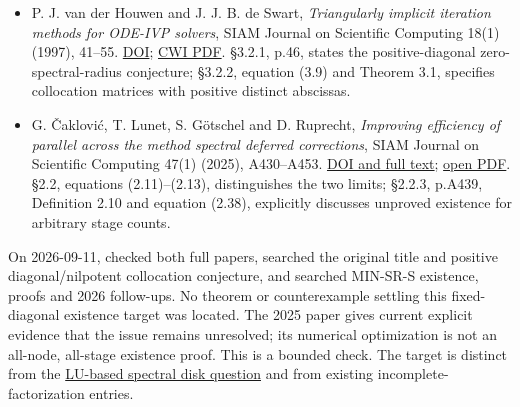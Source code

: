 \documentclass[11pt,a4paper]{article}
\providecommand{\tightlist}{\setlength{\itemsep}{0pt}\setlength{\parskip}{0pt}}
\begin{document}
\begin{itemize}
\tightlist
\item
  P. J. van der Houwen and J. J. B. de Swart, \emph{Triangularly
  implicit iteration methods for ODE-IVP solvers}, SIAM Journal on
  Scientific Computing 18(1) (1997), 41--55.
  \href{https://doi.org/10.1137/S1064827595287456}{DOI};
  \href{https://ir.cwi.nl/pub/2191/2191D.pdf}{CWI PDF}. §3.2.1, p.46,
  states the positive-diagonal zero-spectral-radius conjecture; §3.2.2,
  equation (3.9) and Theorem 3.1, specifies collocation matrices with
  positive distinct abscissas.
\item
  G. Čaklović, T. Lunet, S. Götschel and D. Ruprecht, \emph{Improving
  efficiency of parallel across the method spectral deferred
  corrections}, SIAM Journal on Scientific Computing 47(1) (2025),
  A430--A453. \href{https://doi.org/10.1137/24M1649800}{DOI and full
  text}; \href{https://d-nb.info/1363153935/34}{open PDF}. §2.2,
  equations (2.11)--(2.13), distinguishes the two limits; §2.2.3,
  p.A439, Definition 2.10 and equation (2.38), explicitly discusses
  unproved existence for arbitrary stage counts.
\end{itemize}

On 2026-09-11, checked both full papers, searched the original title and
positive diagonal/nilpotent collocation conjecture, and searched
MIN-SR-S existence, proofs and 2026 follow-ups. No theorem or
counterexample settling this fixed-diagonal existence target was
located. The 2025 paper gives current explicit evidence that the issue
remains unresolved; its numerical optimization is not an all-node,
all-stage existence proof. This is a bounded check. The target is
distinct from the
\href{https://github.com/ajt60gaibb/OpenProblemsInNLA/blob/main/linear-systems-and-elimination/IE-27/README.md}{LU-based
spectral disk question} and from existing incomplete-factorization
entries.
\end{document}
